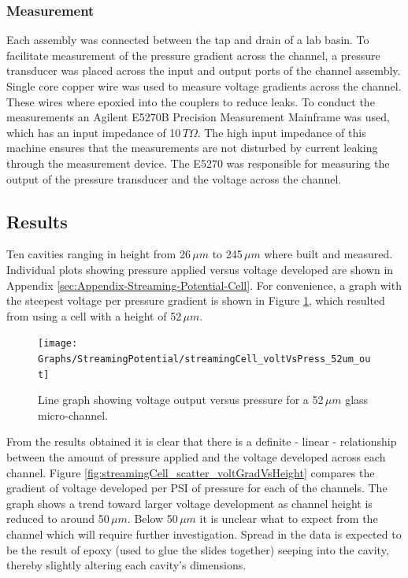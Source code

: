 \subsubsection{Measurement}

Each assembly was connected between the tap and drain of a lab basin.
To facilitate measurement of the pressure gradient across the channel,
a pressure transducer was placed across the input and output ports
of the channel assembly. Single core copper wire was used to measure
voltage gradients across the channel. These wires where epoxied into
the couplers to reduce leaks. To conduct the measurements an Agilent
E5270B Precision Measurement Mainframe was used, which has an input
impedance of 10${\displaystyle \, T\Omega}$. The high input impedance
of this machine ensures that the measurements are not disturbed by
current leaking through the measurement device. The E5270 was responsible
for measuring the output of the pressure transducer and the voltage
across the channel.


\subsection{Results}

Ten cavities ranging in height from 26$\,\mu m$ to 245$\,\mu m$
where built and measured. Individual plots showing pressure applied
versus voltage developed are shown in Appendix \ref{sec:Appendix-Streaming-Potential-Cell}.
For convenience, a graph with the steepest voltage per pressure gradient
is shown in Figure \ref{fig:streamingCell_voltVsPress_52um_convienient},
which resulted from using a cell with a height of 52$\,\mu m$.

\begin{figure}[H]
\centering{}\texttt{[image: Graphs/StreamingPotential/streamingCell\_voltVsPress\_52um\_out]}\protect\caption{\label{fig:streamingCell_voltVsPress_52um_convienient}Line graph
showing voltage output versus pressure for a 52$\,\mu m$ glass micro-channel.}
\end{figure}


From the results obtained it is clear that there is a definite \nobreakdash-
linear \nobreakdash- relationship between the amount of pressure
applied and the voltage developed across each channel. Figure \ref{fig:streamingCell_scatter_voltGradVsHeight}
compares the gradient of voltage developed per PSI of pressure for
each of the channels. The graph shows a trend toward larger voltage
development as channel height is reduced to around 50$\,\mu m$. Below
50$\,\mu m$ it is unclear what to expect from the channel which will
require further investigation. Spread in the data is expected to be
the result of epoxy (used to glue the slides together) seeping into
the cavity, thereby slightly altering each cavity's dimensions.

